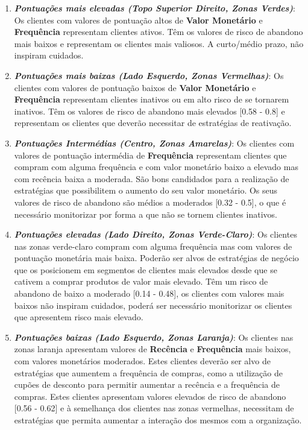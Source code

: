 \documentclass{easychair}
\begin{document}
\begin{enumerate}
	\item \textit{\textbf{Pontuações mais elevadas (Topo Superior Direito, Zonas Verdes)}}: Os clientes com valores de pontuação altos de \textbf{Valor Monetário} e \textbf{Frequência} representam clientes ativos. Têm os valores de risco de abandono mais baixos e representam os clientes mais valiosos. A curto/médio prazo, não inspiram cuidados.
	\item \textit{\textbf{Pontuações mais baixas (Lado Esquerdo, Zonas Vermelhas)}}: Os clientes com valores de pontuação baixos de \textbf{Valor Monetário} e \textbf{Frequência} representam clientes inativos ou em alto risco de se tornarem inativos. Têm os valores de risco de abandono mais elevados [0.58 - 0.8] e representam os clientes que deverão necessitar de estratégias de reativação.
	\item \textit{\textbf{Pontuações Intermédias (Centro, Zonas Amarelas)}}: Os clientes com valores de pontuação intermédia de \textbf{Frequência} representam clientes que compram com alguma frequência e com valor monetário baixo a elevado mas com recência baixa a moderada. São bons candidados para a realização de estratégias que possibilitem o aumento do seu valor monetário. Os seus valores de risco de abandono são médios a moderados [0.32 - 0.5], o que é necessário monitorizar por forma a que não se tornem clientes inativos.
	\item \textit{\textbf{Pontuações elevadas (Lado Direito, Zonas Verde-Claro)}}: Os clientes nas zonas verde-claro compram com alguma frequência mas com valores de pontuação monetária mais baixa. Poderão ser alvos de estratégias de negócio que os posicionem em segmentos de clientes mais elevados desde que se cativem a comprar produtos de valor mais elevado. Têm um risco de abandono de baixo a moderado [0.14 - 0.48], os clientes com valores mais baixos não inspiram cuidados, poderá ser necessário monitorizar os clientes que apresentem risco mais elevado.
	\item \textit{\textbf{Pontuações baixas (Lado Esquerdo, Zonas Laranja)}}: Os clientes nas zonas laranja apresentam valores de \textbf{Recência} e \textbf{Frequência} mais baixos, com valores monetários moderados. Estes clientes deverão ser alvo de estratégias que aumentem a frequência de compras, como a utilização de cupões de desconto para permitir aumentar a recência e a frequência de compras. Estes clientes apresentam valores elevados de risco de abandono [0.56 - 0.62] e à semelhança dos clientes nas zonas vermelhas, necessitam de estratégias que permita aumentar a interação dos mesmos com a organização.
\end{enumerate}
\end{document}
